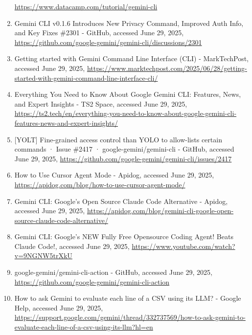 \documentclass[a4paper,12pt]{article}
\begin{document}
\begin{multicols}{2}
\begin{enumerate}
      \url{https://www.datacamp.com/tutorial/gemini-cli}\\
    \item
      Gemini CLI v0.1.6 Introduces New Privacy Command, Improved Auth
      Info, and Key Fixes \#2301 - GitHub, accessed June 29, 2025,
      \url{https://github.com/google-gemini/gemini-cli/discussions/2301}\\
    \item
      Getting started with Gemini Command Line Interface (CLI) -
      MarkTechPost, accessed June 29, 2025,
      \url{https://www.marktechpost.com/2025/06/28/getting-started-with-gemini-command-line-interface-cli/}\\
    \item
      Everything You Need to Know About Google Gemini CLI: Features,
      News, and Expert Insights - TS2 Space, accessed June 29, 2025,
      \url{https://ts2.tech/en/everything-you-need-to-know-about-google-gemini-cli-features-news-and-expert-insights/}\\
    \item
      {[}YOLT{]} Fine-grained access control than YOLO to allow-lists
      certain commands · Issue \#2417 · google-gemini/gemini-cli -
      GitHub, accessed June 29, 2025,
      \url{https://github.com/google-gemini/gemini-cli/issues/2417}\\
    \item
      How to Use Cursor Agent Mode - Apidog, accessed June 29, 2025,
      \url{https://apidog.com/blog/how-to-use-cursor-agent-mode/}\\
    \item
      Gemini CLI: Google's Open Source Claude Code Alternative - Apidog,
      accessed June 29, 2025,
      \url{https://apidog.com/blog/gemini-cli-google-open-source-claude-code-alternative/}\\
    \item
      Gemini CLI: Google's NEW Fully Free Opensource Coding Agent! Beats
      Claude Code!, accessed June 29, 2025,
      \url{https://www.youtube.com/watch?v=9NGNW5trXkU}\\
    \item
      google-gemini/gemini-cli-action - GitHub, accessed June 29, 2025,
      \url{https://github.com/google-gemini/gemini-cli-action}\\
    \item
      How to ask Gemini to evaluate each line of a CSV using its LLM? -
      Google Help, accessed June 29, 2025,
      \url{https://support.google.com/gemini/thread/332737569/how-to-ask-gemini-to-evaluate-each-line-of-a-csv-using-its-llm?hl=en}\\

\end{enumerate}
\end{multicols}
\end{document}
